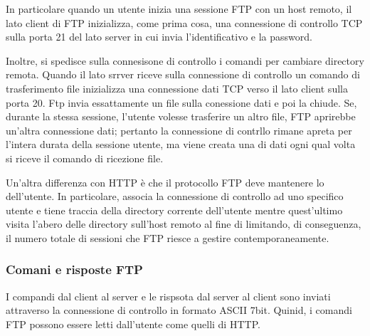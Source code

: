\documentclass{book}
\newcommand{\tmtextbf}[1]{\text{{\bfseries{#1}}}}
\begin{document}
In particolare quando un utente inizia una sessione FTP con un host remoto, il
lato client di FTP inizializza, come prima cosa, una connessione di controllo
TCP sulla porta 21 del lato server in cui invia l'identificativo e la
password.

Inoltre, si spedisce sulla connesisone di controllo i comandi per cambiare
directory remota. Quando il lato srrver riceve sulla connessione di controllo
un comando di trasferimento file inizializza una connessione dati TCP verso il
lato client sulla porta 20. Ftp invia essattamente un file sulla conessione
dati e poi la chiude. Se, durante la stessa sessione, l'utente volesse
trasferire un altro file, FTP aprirebbe un'altra connessione dati; pertanto la
connessione di contrllo rimane apreta per l'intera durata della sessione
utente, ma viene creata una di dati ogni qual volta si riceve il comando di
ricezione file.

Un'altra differenza con HTTP {\`e} che il protocollo FTP deve mantenere lo
\tmtextbf{stato} dell'utente. In particolare, associa la connessione di
controllo ad uno specifico utente e tiene traccia della directory corrente
dell'utente mentre quest'ultimo visita l'abero delle directory sull'host
remoto al fine di limitando, di conseguenza, il numero totale di sessioni che
FTP riesce a gestire contemporaneamente.

\subsubsection{Comani e risposte FTP}

I compandi dal client al server e le rispsota dal server al client sono
inviati attraverso la connessione di controllo in formato ASCII 7bit. Quinid,
i comandi FTP possono essere letti dall'utente come quelli di HTTP.
\end{document}
